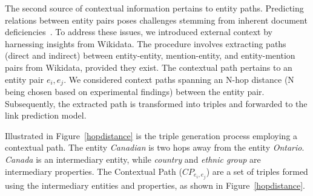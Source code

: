 \documentclass[letterpaper]{article} %
\begin{document}

The second source of contextual information pertains to entity paths. Predicting relations between entity pairs poses challenges stemming from inherent document deficiencies~\cite{DBLP:conf/emnlp/Tan0BNA22}. To address these issues, we introduced external context by harnessing insights from Wikidata.
The procedure involves extracting paths (direct and indirect) between entity-entity, mention-entity, and entity-mention pairs from Wikidata, provided they exist. The contextual path pertains to an entity pair ${{e_i,e_j}}$. We considered context paths spanning an N-hop distance (N being chosen based on experimental findings) between the entity pair. Subsequently, the extracted path is transformed into triples and forwarded to the link prediction model.

Illustrated in Figure~\ref{hopdistance} is the triple generation process employing a contextual path. The entity \textit{Canadian} is two hops away from the entity \textit{Ontario}. \textit{Canada} is an intermediary entity, while \textit{country} and \textit{ethnic group} are intermediary properties. The Contextual Path  ($CP_{e_i,e_j}$) are a set of triples formed using the intermediary entities and properties, as shown in Figure~\ref{hopdistance}.
\end{document}
